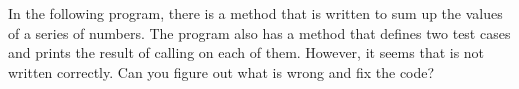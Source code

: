 In the following program, there is a  method that is written to sum up the values of a series of numbers. The program also has a  method that defines two test cases and prints the result of calling  on each of them. However, it seems that  is not written correctly. Can you figure out what is wrong and fix the code?

\inputminted{csharp}{\context/question/Adder.cs}
